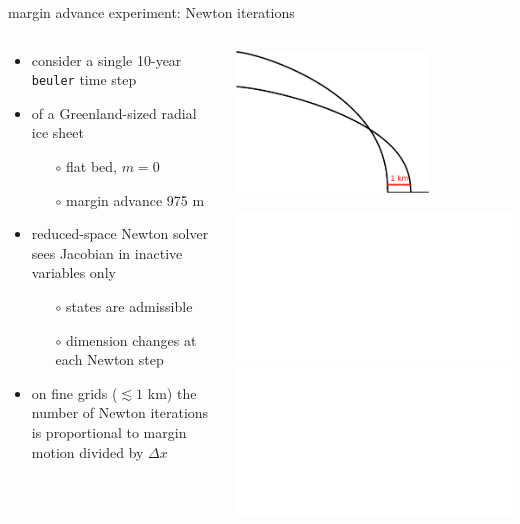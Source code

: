 \documentclass[hide notes,intlimits,usenames,dvipsnames]{beamer}
\begin{document}
\begin{frame}{margin advance experiment: Newton iterations}

\begin{columns}
\begin{column}{0.45\textwidth}
\begin{itemize}
\item consider a single 10-year \texttt{beuler} time step
\item of a Greenland-sized radial ice sheet
    \begin{itemize}
    \item[$\circ$] flat bed, $m=0$
    \item[$\circ$] margin advance 975 m
    \end{itemize}
\item reduced-space Newton solver sees Jacobian in inactive variables only
    \begin{itemize}
    \item[$\circ$] states are admissible
    \item[$\circ$] dimension changes at each Newton step
    \end{itemize}
\item<2> on fine grids ($\lesssim 1$ km) the number of Newton iterations is proportional to margin motion divided by $\Delta x$
\end{itemize}\end{column}
\begin{column}{0.55\textwidth}

\bigskip
\hfill \includegraphics[width=0.7\textwidth]{halfarcartoon.pdf}

\bigskip
\includegraphics<1>[width=\textwidth]{newtoniters.pdf}
\includegraphics<2>[width=\textwidth]{newtonitersFIT.pdf}
\end{column}
\end{columns}
\end{frame}
\end{document}
